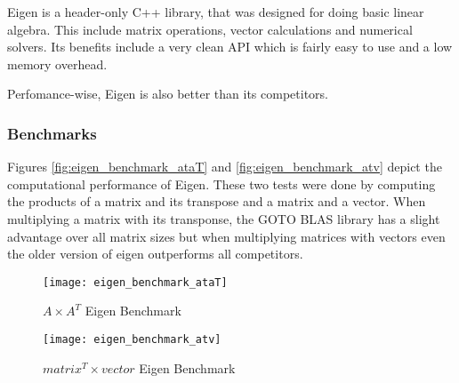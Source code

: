 Eigen is a header-only C++ library, that was designed for doing basic linear algebra. This include matrix operations, vector calculations and numerical solvers. Its benefits include a very clean API which is fairly easy to use and a low memory overhead.

Perfomance-wise, Eigen is also better than its competitors.

\subsubsection{Benchmarks}

Figures \vref{fig:eigen_benchmark_ataT} and \vref{fig:eigen_benchmark_atv} depict the computational performance of Eigen. These two tests were done by computing the products of a matrix and its transpose and a matrix and a vector. When multiplying a matrix with its transponse, the GOTO BLAS library has a slight advantage over all matrix sizes but when multiplying matrices with vectors even the older version of eigen outperforms all competitors.

\begin{figure}[H]
    \centering
    \texttt{[image: eigen\_benchmark\_ataT]}
    \caption[$ A \times A^T $ Eigen Benchmark]{$ A \times A^T $ Eigen Benchmark\footnotemark}
    \label{fig:eigen_benchmark_ataT}
\end{figure}

\begin{figure}[H]
    \centering
    \texttt{[image: eigen\_benchmark\_atv]}
    \caption[$ matrix^T \times vector $ Eigen Benchmark]{$ matrix^T \times vector $ Eigen Benchmark\footnotemark}
    \label{fig:eigen_benchmark_atv}
\end{figure}
